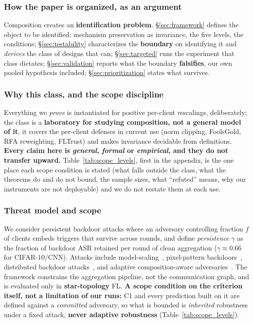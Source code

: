 \documentclass{article}
\begin{document}
\subsubsection{How the paper is organized, as an argument}

Composition creates an \textbf{identification problem}. \S\ref{sec:framework} defines the object to be identified: mechanism preservation as invariance, the five levels, the conditions; \S\ref{sec:testability} characterizes the \textbf{boundary} on identifying it and \emph{derives} the class of designs that can; \S\ref{sec:targeted} runs the experiment that class dictates; \S\ref{sec:validation} reports what the boundary \textbf{falsifies}, our own pooled hypothesis included; \S\ref{sec:prioritization} states what survives.

\subsubsection{Why this class, and the scope discipline}

Everything we \emph{prove} is instantiated for positive per-client rescalings, deliberately: the class is a \textbf{laboratory for studying composition, not a general model of it}, it covers the per-client defenses in current use (norm clipping, FoolsGold, RFA reweighting, FLTrust) and makes invariance decidable from definitions. \textbf{Every claim here is \emph{general}, \emph{formal} or \emph{empirical}, and they do not transfer upward.} Table~\ref{tab:scope_levels}, first in the appendix, is the one place each scope condition is stated (what falls outside the class, what the theorems do and do not bound, the sample sizes, what ``refuted'' means, why our instruments are not deployable) and we do not restate them at each use.

\subsubsection{Threat model and scope}

We consider persistent backdoor attacks where an adversary controlling fraction $f$ of clients embeds triggers that survive across rounds, and define \emph{persistence} $\gamma$ as the fraction of backdoor ASR retained per round of clean aggregation ($\gamma \approx 0.66$ for CIFAR-10/CNN). Attacks include model-scaling~\citep{bagdasaryan2020backdoor}, pixel-pattern backdoors~\citep{chen2017targeted}, distributed backdoor attacks~\citep{xie2019dba}, and adaptive composition-aware adversaries~\citep{shejwalkar2021manipulating}. The framework constrains the aggregation pipeline, not the communication graph, and is evaluated only in \textbf{star-topology} FL. \textbf{A scope condition on the criterion itself, not a limitation of our runs:} C1 and every prediction built on it are defined against a \emph{committed} adversary, so what is bounded is \emph{inherited} robustness under a fixed attack, \textbf{never adaptive robustness} (Table~\ref{tab:scope_levels}).
\end{document}
